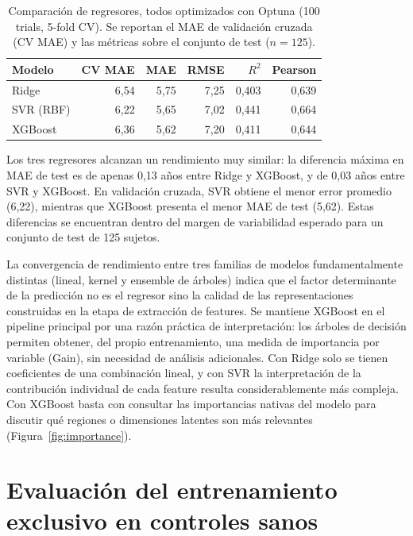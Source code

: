 \begin{table}[H]
\centering
\caption{Comparación de regresores, todos optimizados con Optuna (100 trials, 5-fold CV). Se reportan el MAE de validación cruzada (CV MAE) y las métricas sobre el conjunto de test ($n = 125$).}
\label{tab:model_comparison}
\begin{tabular}{lrrrrr}
\toprule
\textbf{Modelo} & \textbf{CV MAE} & \textbf{MAE} & \textbf{RMSE} & \textbf{$R^2$} & \textbf{Pearson} \\
\midrule
Ridge          & 6,54 & 5,75 & 7,25 & 0,403 & 0,639 \\
SVR (RBF)      & 6,22 & 5,65 & 7,02 & 0,441 & 0,664 \\
XGBoost        & 6,36 & 5,62 & 7,20 & 0,411 & 0,644 \\
\bottomrule
\end{tabular}
\end{table}

Los tres regresores alcanzan un rendimiento muy similar: la diferencia máxima en MAE de test es de apenas 0,13 años entre Ridge y XGBoost, y de 0,03 años entre SVR y XGBoost. En validación cruzada, SVR obtiene el menor error promedio (6,22), mientras que XGBoost presenta el menor MAE de test (5,62). Estas diferencias se encuentran dentro del margen de variabilidad esperado para un conjunto de test de 125 sujetos.

La convergencia de rendimiento entre tres familias de modelos fundamentalmente distintas (lineal, kernel y ensemble de árboles) indica que el factor determinante de la predicción no es el regresor sino la calidad de las representaciones construidas en la etapa de extracción de features. Se mantiene XGBoost en el pipeline principal por una razón práctica de interpretación: los árboles de decisión permiten obtener, del propio entrenamiento, una medida de importancia por variable (Gain), sin necesidad de análisis adicionales. Con Ridge solo se tienen coeficientes de una combinación lineal, y con SVR la interpretación de la contribución individual de cada feature resulta considerablemente más compleja. Con XGBoost basta con consultar las importancias nativas del modelo para discutir qué regiones o dimensiones latentes son más relevantes (Figura~\ref{fig:importance}).


\section{Evaluación del entrenamiento exclusivo en controles sanos}
\label{sec:res_cn_only}

